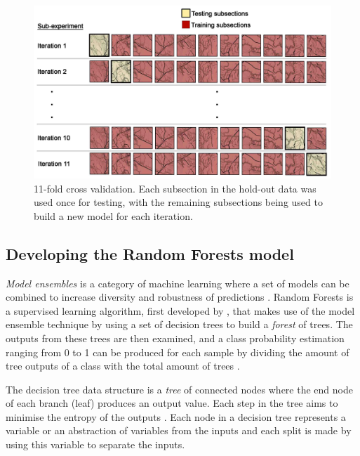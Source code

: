 \documentclass[]{interact}
\theoremstyle{plain}%
\theoremstyle{definition}
\theoremstyle{remark}
\begin{document}
\begin{figure}[!htb]
    \centering
    \includegraphics[width=1\linewidth]{images/cross_validation_lo.jpg}
    \caption{11-fold cross validation. Each subsection in the hold-out data was used once for testing, with the remaining subsections being used to build a new model for each iteration.}
    \label{fig:crossvalidation}
\end{figure}

\subsection{Developing the Random Forests model}

\textit{Model ensembles} is a category of machine learning where a set of models can be combined to increase diversity and robustness of predictions \citep{flach}. Random Forests is a supervised learning algorithm, first developed by \citet{breiman}, that makes use of the model ensemble technique by using a set of decision trees to build a \textit{forest} of trees. The outputs from these trees are then examined, and a class probability estimation ranging from 0 to 1 can be produced for each sample by dividing the amount of tree outputs of a class with the total amount of trees \citep{breiman}.

The decision tree data structure is a \textit{tree} of connected nodes where the end node of each branch (leaf) produces an output value. Each step in the tree aims to minimise the entropy of the outputs \citep{kotsiantis}. Each node in a decision tree represents a variable or an abstraction of variables from the inputs and each split is made by using this variable to separate the inputs.
\end{document}
